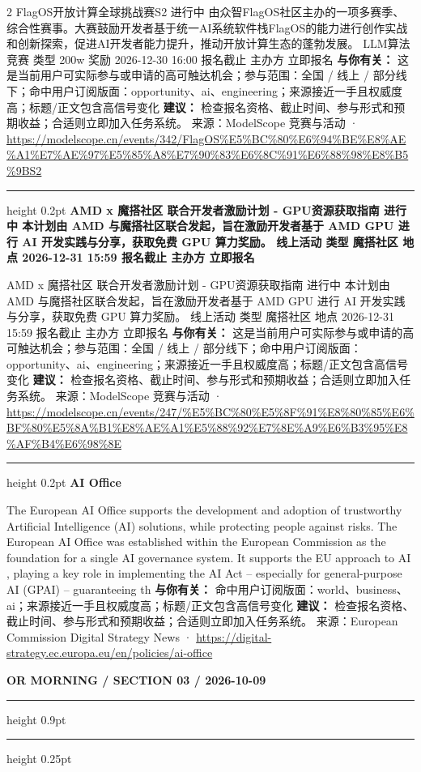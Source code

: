 \documentclass[10.5pt]{ctexart}
\begin{document}
\begin{multicols}{2}
FlagOS开放计算全球挑战赛S2 进行中 由众智FlagOS社区主办的一项多赛季、综合性赛事。大赛鼓励开发者基于统一AI系统软件栈FlagOS的能力进行创作实战和创新探索，促进AI开发者能力提升，推动开放计算生态的蓬勃发展。 LLM算法竞赛 类型 200w 奖励 2026-12-30 16:00 报名截止 主办方 立即报名
\textbf{与你有关：} 这是当前用户可实际参与或申请的高可触达机会；参与范围：全国 / 线上 / 部分线下；命中用户订阅版面：opportunity、ai、engineering；来源接近一手且权威度高；标题/正文包含高信号变化
\textbf{建议：} 检查报名资格、截止时间、参与形式和预期收益；合适则立即加入任务系统。
{\footnotesize\color{ormuted} 来源：ModelScope 竞赛与活动 · \url{https://modelscope.cn/events/342/FlagOS%E5%BC%80%E6%94%BE%E8%AE%A1%E7%AE%97%E5%85%A8%E7%90%83%E6%8C%91%E6%88%98%E8%B5%9BS2}}
\vspace{2mm}
\hrule height 0.2pt
\vspace{2mm}
{\large\bfseries AMD x 魔搭社区 联合开发者激励计划 - GPU资源获取指南 进行中 本计划由 AMD 与魔搭社区联合发起，旨在激励开发者基于 AMD GPU 进行 AI 开发实践与分享，获取免费 GPU 算力奖励。 线上活动 类型 魔搭社区 地点 2026-12-31 15:59 报名截止 主办方 立即报名}\par
AMD x 魔搭社区 联合开发者激励计划 - GPU资源获取指南 进行中 本计划由 AMD 与魔搭社区联合发起，旨在激励开发者基于 AMD GPU 进行 AI 开发实践与分享，获取免费 GPU 算力奖励。 线上活动 类型 魔搭社区 地点 2026-12-31 15:59 报名截止 主办方 立即报名
\textbf{与你有关：} 这是当前用户可实际参与或申请的高可触达机会；参与范围：全国 / 线上 / 部分线下；命中用户订阅版面：opportunity、ai、engineering；来源接近一手且权威度高；标题/正文包含高信号变化
\textbf{建议：} 检查报名资格、截止时间、参与形式和预期收益；合适则立即加入任务系统。
{\footnotesize\color{ormuted} 来源：ModelScope 竞赛与活动 · \url{https://modelscope.cn/events/247/%E5%BC%80%E5%8F%91%E8%80%85%E6%BF%80%E5%8A%B1%E8%AE%A1%E5%88%92%E7%8E%A9%E6%B3%95%E8%AF%B4%E6%98%8E}}
\vspace{2mm}
\hrule height 0.2pt
\vspace{2mm}
{\large\bfseries AI Office}\par
The European AI Office supports the development and adoption of trustworthy Artificial Intelligence (AI) solutions, while protecting people against risks. The European AI Office was established within the European Commission as the foundation for a single AI governance system. It supports the EU approach to AI , playing a key role in implementing the AI Act – especially for general-purpose AI (GPAI) – guaranteeing th
\textbf{与你有关：} 命中用户订阅版面：world、business、ai；来源接近一手且权威度高；标题/正文包含高信号变化
\textbf{建议：} 检查报名资格、截止时间、参与形式和预期收益；合适则立即加入任务系统。
{\footnotesize\color{ormuted} 来源：European Commission Digital Strategy News · \url{https://digital-strategy.ec.europa.eu/en/policies/ai-office}}
\end{multicols}
\newpage
{\small\bfseries OR MORNING / SECTION 03 / 2026-10-09}
\vspace{2mm}
\hrule height 0.9pt
\vspace{1.5mm}
\hrule height 0.25pt
\vspace{4mm}
\end{document}
